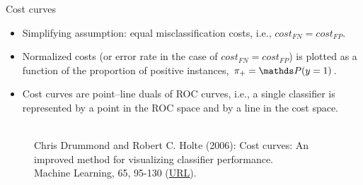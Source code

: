 \begin{vbframe}{Cost curves}

\begin{footnotesize}

\begin{itemize}
  \item Simplifying assumption: equal misclassification costs, i.e.,
  $cost_{FN} = cost_{FP}$.
  \item Normalized costs (or error rate in the case of
  $cost_{FN} = cost_{FP}$) is plotted as a function of the proportion of
  positive instances, $\rp = \P(y = 1)$.
  \item Cost curves are point–line duals of ROC curves, i.e., a single
  classifier is represented by a point in the ROC space and by a line in the
  cost space.
\end{itemize}

\end{footnotesize}

\begin{figure}
  \centering
  \tiny
  \\Chris Drummond and Robert C. Holte (2006): Cost curves: An improved
  method for visualizing classifier performance. \\Machine Learning, 65, 95-130
  (\href{https://www.semanticscholar.org/paper/Cost-curves\%3A-An-improved-method-for  -visualizing-Drummond-Holte/71708ce984e0896e7383435913547e770572410e}
  {\underline{URL}}).
\end{figure}


\end{vbframe}


